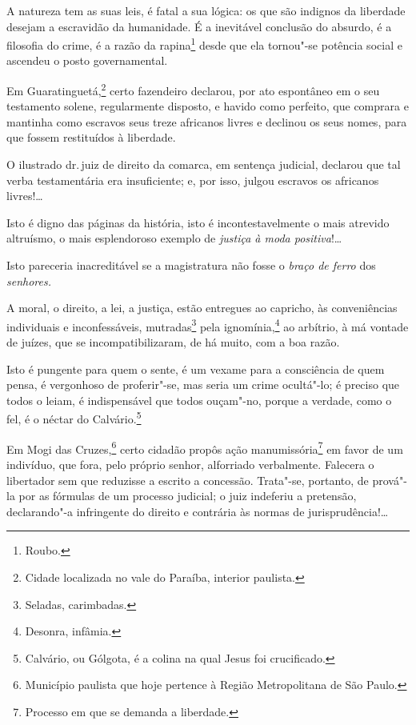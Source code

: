 A natureza tem as suas leis, é fatal a sua lógica: os que são indignos
da liberdade desejam a escravidão da humanidade. É a inevitável
conclusão do absurdo, é a filosofia do crime, é a razão da
rapina\footnote{Roubo.} desde que ela tornou"-se potência social e
ascendeu o posto governamental.

Em Guaratinguetá,\footnote{Cidade localizada no vale do Paraíba,
  interior paulista.} certo fazendeiro declarou, por ato espontâneo em
o seu testamento solene, regularmente disposto, e havido como perfeito,
que comprara e mantinha como escravos seus treze africanos livres e
declinou os seus nomes, para que fossem restituídos à liberdade.

O ilustrado dr.\,juiz de direito da comarca, em sentença judicial,
declarou que tal verba testamentária era insuficiente; e, por isso,
julgou escravos os africanos livres!\ldots{}

Isto é digno das páginas da história, isto é incontestavelmente o mais
atrevido altruísmo, o mais esplendoroso exemplo de \emph{justiça à moda
positiva}!\ldots{}

Isto pareceria inacreditável se a magistratura não fosse o \emph{braço
de ferro} dos \emph{senhores.}

A moral, o direito, a lei, a justiça, estão entregues ao capricho, às
conveniências individuais e inconfessáveis, mutradas\footnote{Seladas,
  carimbadas.} pela ignomínia,\footnote{Desonra, infâmia.} ao
arbítrio, à má vontade de juízes, que se incompatibilizaram, de há
muito, com a boa razão.

Isto é pungente para quem o sente, é um vexame para a consciência de
quem pensa, é vergonhoso de proferir"-se, mas seria um crime ocultá"-lo; é
preciso que todos o leiam, é indispensável que todos ouçam"-no, porque a
verdade, como o fel, é o néctar do Calvário.\footnote{Calvário, ou
  Gólgota, é a colina na qual Jesus foi crucificado.}

Em Mogi das Cruzes,\footnote{Município paulista que hoje pertence à
  Região Metropolitana de São Paulo.} certo cidadão propôs ação
manumissória\footnote{Processo em que se demanda a liberdade.} em
favor de um indivíduo, que fora, pelo próprio senhor, alforriado
verbalmente. Falecera o libertador sem que reduzisse a escrito a
concessão. Trata"-se, portanto, de prová"-la por as fórmulas de um
processo judicial; o juiz indeferiu a pretensão, declarando"-a
infringente do direito e contrária às normas de jurisprudência!\ldots{}

